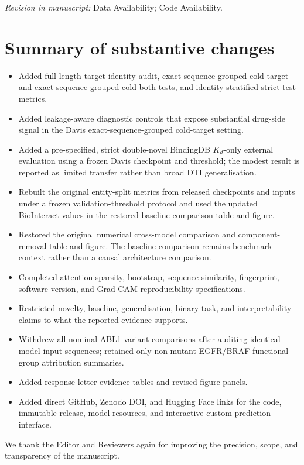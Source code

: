 \documentclass[11pt,a4paper]{article}
\newcommand{\change}[1]{\par\smallskip\noindent\textit{Revision in manuscript:} #1\par\medskip}
\begin{document}
\change{Data Availability; Code Availability.}

\section*{Summary of substantive changes}
\begin{itemize}
  \item Added full-length target-identity audit, exact-sequence-grouped
  cold-target and exact-sequence-grouped cold-both tests, and
  identity-stratified strict-test metrics.
  \item Added leakage-aware diagnostic controls that expose substantial
  drug-side signal in the Davis exact-sequence-grouped cold-target setting.
  \item Added a pre-specified, strict double-novel BindingDB $K_d$-only external
  evaluation using a frozen Davis checkpoint and threshold; the modest result is
  reported as limited transfer rather than broad DTI generalisation.
  \item Rebuilt the original entity-split metrics from released checkpoints and
  inputs under a frozen validation-threshold protocol and used the updated
  BioInteract values in the restored baseline-comparison table and figure.
  \item Restored the original numerical cross-model comparison and
  component-removal table and figure. The baseline comparison remains benchmark
  context rather than a causal architecture comparison.
  \item Completed attention-sparsity, bootstrap, sequence-similarity, fingerprint,
  software-version, and Grad-CAM reproducibility specifications.
  \item Restricted novelty, baseline, generalisation, binary-task, and
  interpretability claims to what the reported evidence supports.
  \item Withdrew all nominal-ABL1-variant comparisons after auditing identical
  model-input sequences; retained only non-mutant EGFR/BRAF functional-group
  attribution summaries.
  \item Added response-letter evidence tables and revised figure panels.
  \item Added direct GitHub, Zenodo DOI, and Hugging Face links for the code,
  immutable release, model resources, and interactive custom-prediction interface.
\end{itemize}

We thank the Editor and Reviewers again for improving the precision, scope, and
transparency of the manuscript.
\end{document}
